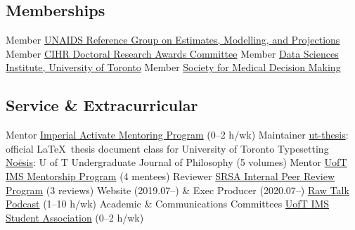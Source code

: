 \subsection{Memberships}
  {Member}
  {\href{https://epidem.org}{UNAIDS Reference Group on Estimates, Modelling, and Projections}}
  {Member}
  {\href{https://cihr-irsc.gc.ca/e/48273.html}{CIHR Doctoral Research Awards Committee}}
  {Member}
  {\href{https://datasciences.utoronto.ca/}{Data Sciences Institute, University of Toronto}}
  {Member}
  {\href{https://smdm.org/}{Society for Medical Decision Making}}
\subsection{Service \& Extracurricular}
  {Mentor}
  {\href{https://www.imperial.ac.uk/students/academic-support/graduate-school/wellbeing-and-support/activate-student-mentoring-programme/}
        {Imperial Activate Mentoring Program} (0--2 h/wk)}
  {Maintainer}
  {\href{https://www.ctan.org/pkg/ut-thesis}{ut-thesis}: official \LaTeX\ thesis document class for University of Toronto}
  {Typesetting} %
  {\href{https://www.noesisjournal.com}{No\={e}sis}: U of T Undergraduate Journal of Philosophy (5 volumes)}
  {Mentor} %
  {\href{https://ims.utoronto.ca/ims-p2p-mentorship}{UofT IMS Mentorship Program} (4 mentees)}
  {Reviewer} %
  {\href{https://research.unityhealth.to/future-students-trainees/st-michaels-hospital-research-student-association}
        {SRSA Internal Peer Review Program} (3 reviews)}
  {Website \textnormal{(2019.07--)} \& Exec Producer \textnormal{(2020.07--)}}
  {\href{https://www.rawtalkpodcast.com}{Raw Talk Podcast} (1--10 h/wk)}
  {Academic \& Communications Committees}
  {\href{https://imssa.ca}{UofT IMS Student Association} (0--2 h/wk)}
